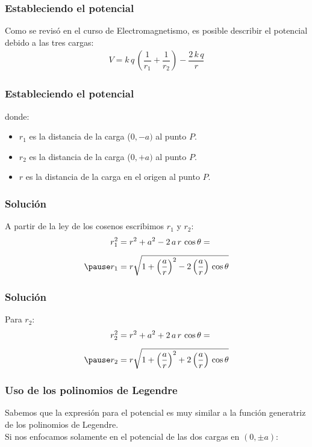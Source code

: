 \documentclass[12pt]{beamer}
\begin{document}
\begin{frame}
\frametitle{Estableciendo el potencial}
Como se revisó en el curso de Electromagnetismo, es posible describir el potencial debido a las tres cargas:
\pause
\begin{align}
V = k \, q \, \left( \dfrac{1}{r_{1}} + \dfrac{1}{r_{2}} \right) - \dfrac{2 \, k \, q}{r}
\label{eq:ecuacion_01}
\end{align}
\end{frame}
\begin{frame}
\frametitle{Estableciendo el potencial}
\begin{figure}
    \centering
    
\end{figure}
\pause
\fontsize{12}{12}\selectfont
donde:
\begin{itemize}[<+->]
\item $r_{1}$ es la distancia de la carga ($0, -a)$ al punto $P$.
\item $r_{2}$ es la distancia de la carga ($0, +a)$ al punto $P$.
\item $r$ es la distancia de la carga en el origen al punto $P$.
\end{itemize}
\end{frame}
\begin{frame}
\frametitle{Solución}
A partir de la ley de los cosenos escribimos $r_{1}$ y $r_{2}$:
\pause
\begin{eqnarray*}
\begin{aligned}
r_{1}^{2} &= r^{2} + a^{2} - 2 \, a \, r \, \cos \theta =  \\[0.5em] \pause 
r_{1} &= r \sqrt{1 + \left( \dfrac{a}{r} \right)^{2} - 2 \left( \dfrac{a}{r} \right) \, \cos \theta}
\end{aligned}
\end{eqnarray*}
\end{frame}
\begin{frame}
\frametitle{Solución}
Para $r_{2}$:
\pause
\begin{eqnarray*}
\begin{aligned}
r_{2}^{2} &= r^{2} + a^{2} + 2 \, a \, r \, \cos \theta =  \\[0.5em] \pause
r_{2} &= r \sqrt{1 + \left( \dfrac{a}{r} \right)^{2} + 2 \left( \dfrac{a}{r} \right) \, \cos \theta}
\end{aligned}
\end{eqnarray*}
\end{frame}
\begin{frame}
\frametitle{Uso de los polinomios de Legendre}
Sabemos que la expresión para el potencial es muy similar a la función generatriz de los polinomios de Legendre.
\\
\bigskip
\pause
Si nos enfocamos solamente en el potencial de las dos cargas en $(0, \pm a)$:
\end{frame}
\end{document}
